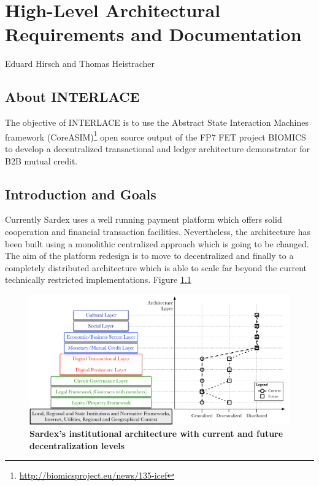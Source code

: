 \chapter{High-Level Architectural Requirements and Documentation}
\label{ch:archreq}

\vspace{-1cm}
\begin{center}
Eduard Hirsch and Thomas Heistracher
\end{center}

\section{About INTERLACE}
The objective of INTERLACE is to use the Abstract State Interaction Machines framework (CoreASIM)\footnote{\url{http://biomicsproject.eu/news/135-icef}} open source output of the FP7 FET project BIOMICS to develop a decentralized transactional and ledger architecture demonstrator for B2B mutual credit.

\section{Introduction and Goals}\label{section-introduction-and-goals}
Currently Sardex uses a well running payment platform which offers solid cooperation and financial transaction facilities. Nevertheless, the architecture has been built using a monolithic centralized approach which is going to be changed. The aim of the platform redesign is to move to decentralized and finally to a completely distributed architecture which is able to scale far beyond the current technically restricted implementations. Figure \ref{decentralizedarchitecture}

\begin{figure}[htbp]
\centering
\includegraphics[width=15cm]{Figures/Sardex_Institutional_Structure_V3}
\caption{\small\textbf{Sardex's institutional architecture with current and future decentralization levels}}
\label{decentralizedarchitecture}
\end{figure}

